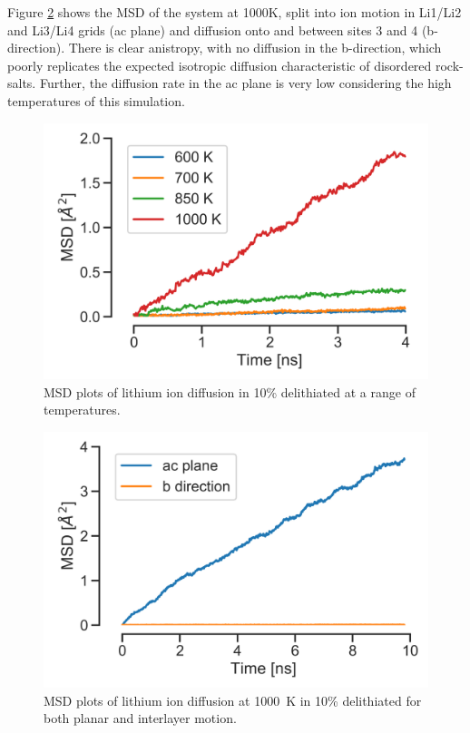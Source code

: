 Figure \ref{fig:msd1000} shows the MSD of the system at 1000K, split into ion motion in Li1/Li2 and Li3/Li4 grids (ac plane) and diffusion onto and between sites 3 and 4 (b-direction).
There is clear anistropy, with no diffusion in the b-direction, which poorly replicates the expected isotropic diffusion characteristic of disordered rock-salts.
Further, the diffusion rate in the ac plane is very low considering the high temperatures of this simulation.

\begin{figure}[p]
\centering
\includegraphics[width=0.8\linewidth]{figures/static/MSD_all}
\caption{MSD plots of lithium ion diffusion in 10\% delithiated  at a range of temperatures.}
\label{fig:msdall}
\end{figure}

\begin{figure}[p]
\centering
\includegraphics[width=0.8\linewidth]{figures/static/MSD_1000}
\caption{MSD plots of lithium ion diffusion at \SI{1000}{\kelvin} in 10\% delithiated  for both planar and interlayer motion.}
\label{fig:msd1000}
\end{figure}

